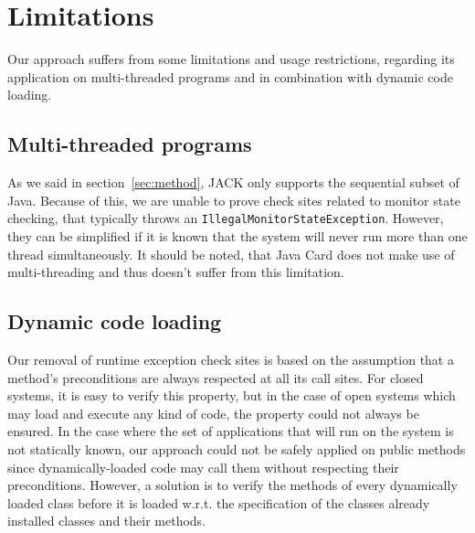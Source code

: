 

\section{Limitations}
\label{sec:limitations}

Our approach suffers from some limitations and usage restrictions, regarding its application on multi-threaded programs and in combination with dynamic code loading.

\subsection{Multi-threaded programs}

As we said in section~\ref{sec:method}, JACK only supports the sequential subset of Java. Because of this, we are unable to prove check sites related to monitor state checking, that typically throws an \texttt{IllegalMonitorStateException}. However, they can be simplified if it is known that the system will never run more than one thread simultaneously. It should be noted, that Java Card does not make use of multi-threading and thus doesn't suffer from this limitation.

\subsection{Dynamic code loading}

Our removal of runtime exception check sites is based on the assumption that a method's preconditions are always respected at all its call sites.
 For closed systems, it is easy to verify this property, but in the case of open systems which may load and execute any kind of code, the property
 could not always be ensured. In the case where the set of applications that will run on the system is not statically known, our approach
 could not be safely applied on public methods since dynamically-loaded code may call them without respecting their preconditions. However, a solution
 is to verify the methods of every dynamically loaded class before it is loaded w.r.t. the specification of the classes already installed classes and their methods. 

